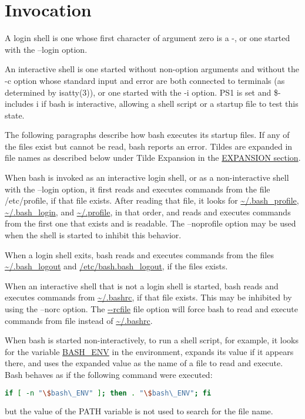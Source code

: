 \section{Invocation}\label{sec:invocation}
A login shell is one whose first character of argument zero is a -, or one started with the --login option.

An interactive shell is one started without non-option arguments and without the -c option whose standard input and error are both connected to terminals (as determined by isatty(3)), or one started with the -i option. PS1 is set and \$- includes i if bash is interactive, allowing a shell script or a startup file to test this state.

The following paragraphs describe how bash executes its startup files. If any of the files exist but cannot be read, bash reports an error. Tildes are expanded in file names as described below under Tilde Expansion in the \hyperref[sec:expansion]{EXPANSION section}.

When bash is invoked as an interactive login shell, or as a non-interactive shell with the --login option, it first reads and executes commands from the file /etc/profile, if that file exists. After reading that file, it looks for \url{~/.bash_profile}, \url{~/.bash_login}, and \url{~/.profile}, in that order, and reads and executes commands from the first one that exists and is readable. The --noprofile option may be used when the shell is started to inhibit this behavior.

When a login shell exits, bash reads and executes commands from the files \url{~/.bash_logout} and \url{/etc/bash.bash_logout}, if the files exists.

When an interactive shell that is not a login shell is started, bash reads and executes commands from \url{~/.bashrc}, if that file exists. This may be inhibited by using the --norc option. The \url{--rcfile} file option will force bash to read and execute commands from file instead of \url{~/.bashrc}.

When bash is started non-interactively, to run a shell script, for example, it looks for the variable \url{BASH_ENV} in the environment, expands its value if it appears there, and uses the expanded value as the name of a file to read and execute. Bash behaves as if the following command were executed:

\begin{lstlisting}[language=bash]
    if [ -n "\$bash\_ENV" ]; then . "\$bash\_ENV"; fi
\end{lstlisting}
but the value of the PATH variable is not used to search for the file name.

